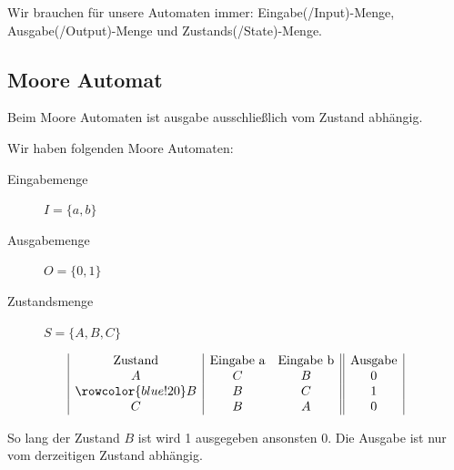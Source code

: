 \documentclass{article}
\begin{document}
Wir brauchen für unsere Automaten immer: Eingabe(/Input)-Menge, Ausgabe(/Output)-Menge und Zustands(/State)-Menge. 
 
\subsection{Moore Automat}

Beim Moore Automaten ist ausgabe ausschließlich vom Zustand abhängig. 

Wir haben folgenden Moore Automaten: 

\begin{description}
    \item[Eingabemenge]  $I=\{a,b\}$
    \item[Ausgabemenge]  $O=\{0,1\}$
    \item[Zustandsmenge] $S=\{A,B,C\}$
\end{description}

\begin{center}
\end{center}

\begin{align*}
    \begin{array}{|c | c  c  || c |}
        \text{Zustand} & \text{Eingabe a} & \text{Eingabe b} & \text{Ausgabe} \\ 
        A & C & B & 0 \\
        \rowcolor{blue!20}  B & B & C & 1 \\
        C & B & A & 0 \\
    \end{array}
\end{align*}

So lang der Zustand $B$ ist wird 1 ausgegeben ansonsten 0. Die Ausgabe ist nur vom derzeitigen Zustand abhängig.
\end{document}
